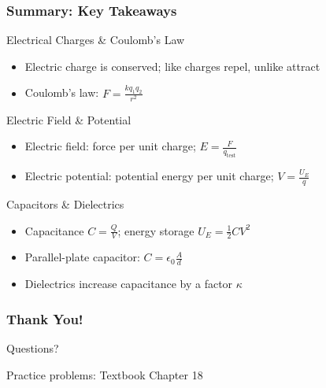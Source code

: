 \documentclass{beamer}
\begin{document}
\begin{frame}
    \frametitle{Summary: Key Takeaways}
    \begin{block}{Electrical Charges \& Coulomb's Law}
        \begin{itemize}
            \item Electric charge is conserved; like charges repel, unlike attract
            \item Coulomb's law: $F = \frac{kq_1q_2}{r^2}$
        \end{itemize}
    \end{block}
    
    \begin{block}{Electric Field \& Potential}
        \begin{itemize}
            \item Electric field: force per unit charge; $E = \frac{F}{q_{\text{test}}}$
            \item Electric potential: potential energy per unit charge; $V = \frac{U_E}{q}$
        \end{itemize}
    \end{block}
    
    \begin{block}{Capacitors \& Dielectrics}
        \begin{itemize}
            \item Capacitance $C = \frac{Q}{V}$; energy storage $U_E = \frac{1}{2}CV^2$
            \item Parallel-plate capacitor: $C = \epsilon_0 \frac{A}{d}$
            \item Dielectrics increase capacitance by a factor $\kappa$
        \end{itemize}
    \end{block}
\end{frame}

\begin{frame}
    \frametitle{Thank You!}
    \begin{center}
        \Large Questions?
        
        \vspace{1cm}
        
        \normalsize Practice problems: Textbook Chapter 18 
    \end{center}
\end{frame}
\end{document}
